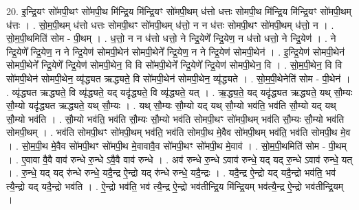 \documentclass[17pt]{extarticle}
\begin{document}
20. इ॒न्द्रि॒यꣳ सो॑मपी॒थꣳ सो॑मपी॒थ मि॑न्द्रि॒य मि॑न्द्रि॒यꣳ सो॑मपी॒थम् ध॑त्तो धत्तः सोमपी॒थ मि॑न्द्रि॒य मि॑न्द्रि॒यꣳ सो॑मपी॒थम् ध॑त्तः । . सो॒म॒पी॒थम् ध॑त्तो धत्तः सोमपी॒थꣳ सो॑मपी॒थम् ध॑त्तो॒ न न ध॑त्तः सोमपी॒थꣳ सो॑मपी॒थम् ध॑त्तो॒ न । . सो॒म॒पी॒थमिति॑ सोम - पी॒थम् । . ध॒त्तो॒ न न ध॑त्तो धत्तो॒ ने न्द्रि॒येणे᳚ न्द्रि॒येण॒ न ध॑त्तो धत्तो॒ ने न्द्रि॒येण॑ । . ने न्द्रि॒येणे᳚ न्द्रि॒येण॒ न ने न्द्रि॒येण॑ सोमपी॒थेन॑ सोमपी॒थेने᳚ न्द्रि॒येण॒ न ने न्द्रि॒येण॑ सोमपी॒थेन॑ । . इ॒न्द्रि॒येण॑ सोमपी॒थेन॑ सोमपी॒थेने᳚ न्द्रि॒येणे᳚ न्द्रि॒येण॑ सोमपी॒थेन॒ वि वि सो॑मपी॒थेने᳚ न्द्रि॒येणे᳚ न्द्रि॒येण॑ सोमपी॒थेन॒ वि । . सो॒म॒पी॒थेन॒ वि वि सो॑मपी॒थेन॑ सोमपी॒थेन॒ व्यृ॑द्ध्यत ऋद्ध्यते॒ वि सो॑मपी॒थेन॑ सोमपी॒थेन॒ व्यृ॑द्ध्यते । . सो॒म॒पी॒थेनेति॑ सोम - पी॒थेन॑ । . व्यृ॑द्ध्यत ऋद्ध्यते॒ वि व्यृ॑द्ध्यते॒ यद् यदृ॑द्ध्यते॒ वि व्यृ॑द्ध्यते॒ यत् । . ऋ॒द्ध्य॒ते॒ यद् यदृ॑द्ध्यत ऋद्ध्यते॒ यथ् सौ॒म्यः सौ॒म्यो यदृ॑द्ध्यत ऋद्ध्यते॒ यथ् सौ॒म्यः । . यथ् सौ॒म्यः सौ॒म्यो यद् यथ् सौ॒म्यो भव॑ति॒ भव॑ति सौ॒म्यो यद् यथ् सौ॒म्यो भव॑ति । . सौ॒म्यो भव॑ति॒ भव॑ति सौ॒म्यः सौ॒म्यो भव॑ति सोमपी॒थꣳ सो॑मपी॒थम् भव॑ति सौ॒म्यः सौ॒म्यो भव॑ति सोमपी॒थम् । . भव॑ति सोमपी॒थꣳ सो॑मपी॒थम् भव॑ति॒ भव॑ति सोमपी॒थ मे॒वैव सो॑मपी॒थम् भव॑ति॒ भव॑ति सोमपी॒थ मे॒व । . सो॒म॒पी॒थ मे॒वैव सो॑मपी॒थꣳ सो॑मपी॒थ मे॒वावावै॒व सो॑मपी॒थꣳ सो॑मपी॒थ मे॒वाव॑ । . सो॒म॒पी॒थमिति॑ सोम - पी॒थम् । . ए॒वावा वै॒वै वाव॑ रुन्धे रु॒न्धे ऽवै॒वै वाव॑ रुन्धे । . अव॑ रुन्धे रु॒न्धे ऽवाव॑ रुन्धे॒ यद् यद् रु॒न्धे ऽवाव॑ रुन्धे॒ यत् । . रु॒न्धे॒ यद् यद् रु॑न्धे रुन्धे॒ यदै॒न्द्र ऐ॒न्द्रो यद् रु॑न्धे रुन्धे॒ यदै॒न्द्रः । . यदै॒न्द्र ऐ॒न्द्रो यद् यदै॒न्द्रो भव॑ति॒ भव॑ त्यै॒न्द्रो यद् यदै॒न्द्रो भव॑ति । . ऐ॒न्द्रो भव॑ति॒ भव॑ त्यै॒न्द्र ऐ॒न्द्रो भव॑तीन्द्रि॒य मि॑न्द्रि॒यम् भव॑त्यै॒न्द्र ऐ॒न्द्रो भव॑तीन्द्रि॒यम् । \newline
\end{document}
